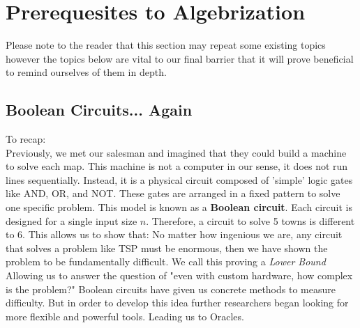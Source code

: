 \documentclass[12pt]{report}
\begin{document}
\newpage
\chapter{Prerequesites to Algebrization}
Please note to the reader that this section may repeat some existing topics however the topics below are vital to our final barrier that it will prove beneficial to remind ourselves of them in depth.

\section{Boolean Circuits... Again}
To recap:\\
Previously, we met our salesman and imagined that they could build a machine to solve each map.
This machine is not a computer in our sense, it does not run lines sequentially.
Instead, it is a physical circuit composed of 'simple' logic gates like AND, OR, and NOT.
These gates are arranged in a fixed pattern to solve one specific problem.
This model is known as a \textbf{Boolean circuit}.
Each circuit is designed for a single input size $n$.
Therefore, a circuit to solve 5 towns is different to 6.
This allows us to show that: No matter how ingenious we are, any circuit that solves a problem like TSP must be enormous, then we have shown the problem to be fundamentally difficult.
We call this proving a \textit{Lower Bound}
Allowing us to answer the question of "even with custom hardware, how complex is the problem?"
Boolean circuits have given us concrete methods to measure difficulty.
But in order to develop this idea further researchers began looking for more flexible and powerful tools.
Leading us to Oracles.
\end{document}
